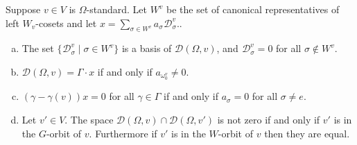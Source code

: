 \documentclass[11pt,fleqn]{amsart}
\newcommand\DD[3]{{}^{#1} \mathcal D_{#2}^{#3}}
\begin{document}
\begin{Proposition}
\label{P:gamma-module-structure}
Suppose $v \in V$ is $\Omega$-standard. Let $W^v$ be the set of canonical 
representatives of left $W_v$-cosets and let $x = \sum_{\sigma \in W^v} 
a_\sigma \DD{}{\sigma}{v}$..
\begin{enumerate}[(a)]
\item 
\label{i:gamma-basis}
The set $\{\DD{}{\sigma}{v} \mid \sigma \in W^v\}$ is a basis of 
$\mathcal D(\Omega, v)$, and $\DD{}{\sigma}{v} = 0$ for all $\sigma \notin 
W^v$.

\item 
\label{i:gamma-cyclic}
$\mathcal D(\Omega, v) = \Gamma \cdot x$ if and only if $a_{\omega_0^v} \neq 
0$.

\item
\label{i:gamma-ev-kernel}
$(\gamma - \gamma(v)) x = 0$ for all $\gamma \in \Gamma$ if and only if 
$a_\sigma = 0$ for all $\sigma \neq e$.

\item 
\label{i:gamma-comparision}
Let $v' \in V$. The space $\mathcal D(\Omega, v) \cap \mathcal 
D(\Omega, v')$ is not zero if and only if $v'$ is in the $G$-orbit of $v$. 
Furthermore if $v'$ is in the $W$-orbit of $v$ then they are equal.
\end{enumerate}
\end{Proposition}
\end{document}
